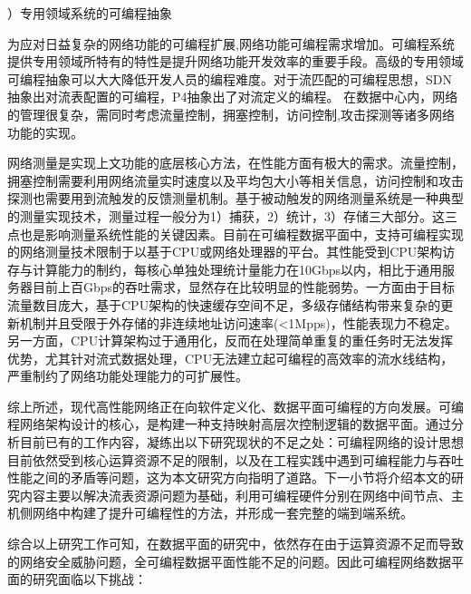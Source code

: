 {）专用领域系统的可编程抽象}



为应对日益复杂的网络功能的可编程扩展,网络功能可编程需求增加。可编程系统提供专用领域所特有的特性是提升网络功能开发效率的重要手段。高级的专用领域可编程抽象可以大大降低开发人员的编程难度。对于流匹配的可编程思想，SDN抽象出对流表配置的可编程，P4抽象出了对流定义的编程。
在数据中心内，网络的管理很复杂，需同时考虑流量控制，拥塞控制，访问控制,攻击探测等诸多网络功能的实现。



网络测量是实现上文功能的底层核心方法，在性能方面有极大的需求。流量控制，拥塞控制需要利用网络流量实时速度以及平均包大小等相关信息，访问控制和攻击探测也需要用到流触发的反馈测量机制。基于被动触发的网络测量系统是一种典型的测量实现技术，测量过程一般分为1）捕获，2）统计，3）存储三大部分。这三点也是影响测量系统性能的关键因素。目前在可编程数据平面中，支持可编程实现的网络测量技术限制于以基于CPU或网络处理器的平台。其性能受到CPU架构访存与计算能力的制约，每核心单独处理统计量能力在10Gbps以内，相比于通用服务器目前上百Gbps的吞吐需求，显然存在比较明显的性能弱势。一方面由于目标流量数目庞大，基于CPU架构的快速缓存空间不足，多级存储结构带来复杂的更新机制并且受限于外存储的非连续地址访问速率(<1Mpps)，性能表现力不稳定。另一方面，CPU计算架构过于通用化，反而在处理简单重复的重任务时无法发挥优势，尤其针对流式数据处理，CPU无法建立起可编程的高效率的流水线结构，严重制约了网络功能处理能力的可扩展性。


综上所述，现代高性能网络正在向软件定义化、数据平面可编程的方向发展。可编程网络架构设计的核心，是构建一种支持映射高层次控制逻辑的数据平面。通过分析目前已有的工作内容，凝练出以下研究现状的不足之处：可编程网络的设计思想目前依然受到核心运算资源不足的限制，以及在工程实践中遇到可编程能力与吞吐性能之间的矛盾等问题，这为本文研究方向指明了道路。下一小节将介绍本文的研究内容主要以解决流表资源问题为基础，利用可编程硬件分别在网络中间节点、主机侧网络中构建了提升可编程性的方法，并形成一套完整的端到端系统。


\label{chap13}



\label{chap131}

综合以上研究工作可知，在数据平面的研究中，依然存在由于运算资源不足而导致的网络安全威胁问题，全可编程数据平面性能不足的问题。因此可编程网络数据平面的研究面临以下挑战：

